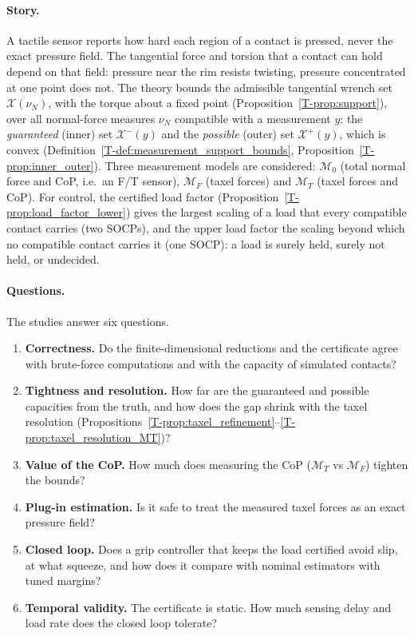 \documentclass[11pt,a4paper]{article}
\newcommand{\M}{\mathcal M}
\newcommand{\X}{\mathcal X}
\newcommand{\T}[1]{\ref{T-#1}}                       %
\begin{document}
\paragraph{Story.} A tactile sensor reports how hard each region of a contact is pressed, never the exact pressure field. The tangential force
and torsion that a contact can hold depend on that field: pressure near the rim resists twisting, pressure concentrated at one point does not.
The theory bounds the admissible tangential wrench set $\X(\nu_N)$, with the torque about a fixed point (Proposition~\T{prop:support}), over all
normal-force measures $\nu_N$ compatible with a measurement $y$: the \emph{guaranteed} (inner) set $\X^-(y)$ and the \emph{possible} (outer) set
$\X^+(y)$, which is convex (Definition~\T{def:measurement_support_bounds}, Proposition~\T{prop:inner_outer}). Three measurement models are considered:
$\M_0$ (total normal force and CoP, i.e.\ an F/T sensor), $\M_F$ (taxel forces) and $\M_T$ (taxel forces and CoP). For control, the certified load factor (Proposition~\T{prop:load_factor_lower}) gives the largest scaling of a load that every compatible contact carries (two SOCPs), and the upper load
factor the scaling beyond which no compatible contact carries it (one SOCP): a load is surely held, surely not held, or undecided.

\paragraph{Questions.} The studies answer six questions.
\begin{enumerate}[label=\textbf{Q\arabic*}]
    \item \textbf{Correctness.} Do the finite-dimensional reductions and the certificate agree with brute-force computations and with the
    capacity of simulated contacts?
    \item \textbf{Tightness and resolution.} How far are the guaranteed and possible capacities from the truth, and how does the gap shrink with the
    taxel resolution (Propositions~\T{prop:taxel_refinement}--\T{prop:taxel_resolution_MT})?
    \item \textbf{Value of the CoP.} How much does measuring the CoP ($\M_T$ vs $\M_F$) tighten the bounds?
    \item \textbf{Plug-in estimation.} Is it safe to treat the measured taxel forces as an exact pressure field?
    \item \textbf{Closed loop.} Does a grip controller that keeps the load certified avoid slip, at what squeeze, and how does it compare with
    nominal estimators with tuned margins?
    \item \textbf{Temporal validity.} The certificate is static. How much sensing delay and load rate does the closed loop tolerate?
\end{enumerate}
\end{document}
